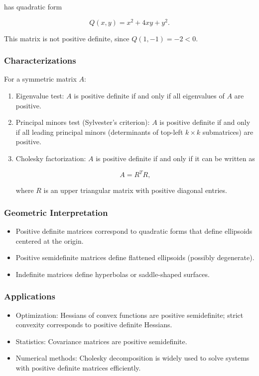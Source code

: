 \documentclass[
  12pt,
  a4paper,
]{article}
\begin{document}
has quadratic form

\[Q(x,y) = x^2 + 4xy + y^2.\]

This matrix is not positive definite, since \(Q(1,-1) = -2 < 0\).

\subsubsection{Characterizations}\label{characterizations}

For a symmetric matrix \(A\):

\begin{enumerate}
\def\labelenumi{\arabic{enumi}.}
\item
  Eigenvalue test: \(A\) is positive definite if and only if all
  eigenvalues of \(A\) are positive.
\item
  Principal minors test (Sylvester's criterion): \(A\) is positive
  definite if and only if all leading principal minors (determinants of
  top-left \(k \times k\) submatrices) are positive.
\item
  Cholesky factorization: \(A\) is positive definite if and only if it
  can be written as

  \[A = R^T R,\]

  where \(R\) is an upper triangular matrix with positive diagonal
  entries.
\end{enumerate}

\subsubsection{Geometric
Interpretation}\label{geometric-interpretation-21}

\begin{itemize}
\item
  Positive definite matrices correspond to quadratic forms that define
  ellipsoids centered at the origin.
\item
  Positive semidefinite matrices define flattened ellipsoids (possibly
  degenerate).
\item
  Indefinite matrices define hyperbolas or saddle-shaped surfaces.
\end{itemize}

\subsubsection{Applications}\label{applications}

\begin{itemize}
\item
  Optimization: Hessians of convex functions are positive semidefinite;
  strict convexity corresponds to positive definite Hessians.
\item
  Statistics: Covariance matrices are positive semidefinite.
\item
  Numerical methods: Cholesky decomposition is widely used to solve
  systems with positive definite matrices efficiently.
\end{itemize}
\end{document}
